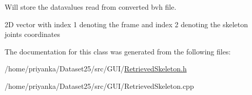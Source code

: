 \-Will store the datavalues read from converted bvh file. 

2\-D vector with index 1 denoting the frame and index 2 denoting the skeleton joints coordinates 

\-The documentation for this class was generated from the following files\-:\begin{DoxyCompactItemize}
\item 
/home/priyanka/\-Dataset25/src/\-G\-U\-I/\hyperlink{RetrievedSkeleton_8h}{\-Retrieved\-Skeleton.\-h}\item 
/home/priyanka/\-Dataset25/src/\-G\-U\-I/\-Retrieved\-Skeleton.\-cpp\end{DoxyCompactItemize}
